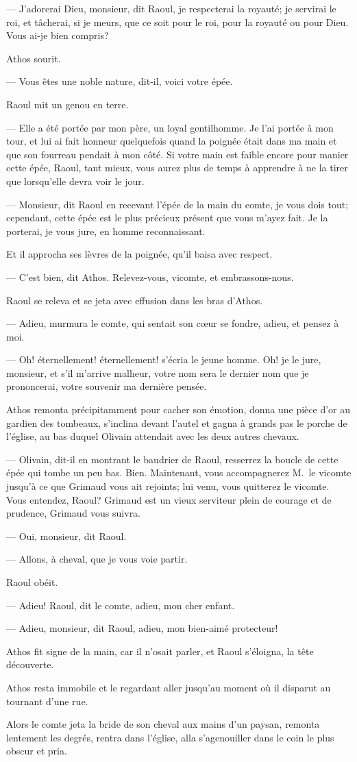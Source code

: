 — J'adorerai Dieu, monsieur, dit Raoul, je respecterai la royauté; je servirai le roi, et tâcherai, si je meurs, que ce soit pour le roi, pour la royauté ou pour Dieu. Vous ai-je bien compris?

Athos sourit.

— Vous êtes une noble nature, dit-il, voici votre épée.

Raoul mit un genou en terre.

— Elle a été portée par mon père, un loyal gentilhomme. Je l'ai portée à mon tour, et lui ai fait honneur quelquefois quand la poignée était dans ma main et que son fourreau pendait à mon côté. Si votre main est faible encore pour manier cette épée, Raoul, tant mieux, vous aurez plus de temps à apprendre à ne la tirer que lorsqu'elle devra voir le jour.

— Monsieur, dit Raoul en recevant l'épée de la main du comte, je vous dois tout; cependant, cette épée est le plus précieux présent que vous m'ayez fait. Je la porterai, je vous jure, en homme reconnaissant.

Et il approcha ses lèvres de la poignée, qu'il baisa avec respect.

— C'est bien, dit Athos. Relevez-vous, vicomte, et embrassons-nous.

Raoul se releva et se jeta avec effusion dans les bras d'Athos.

— Adieu, murmura le comte, qui sentait son cœur se fondre, adieu, et pensez à moi.

— Oh! éternellement! éternellement! s'écria le jeune homme. Oh! je le jure, monsieur, et s'il m'arrive malheur, votre nom sera le dernier nom que je prononcerai, votre souvenir ma dernière pensée.

Athos remonta précipitamment pour cacher son émotion, donna une pièce d'or au gardien des tombeaux, s'inclina devant l'autel et gagna à grands pas le porche de l'église, au bas duquel Olivain attendait avec les deux autres chevaux.

— Olivain, dit-il en montrant le baudrier de Raoul, resserrez la boucle de cette épée qui tombe un peu bas. Bien. Maintenant, vous accompagnerez M.~le vicomte jusqu'à ce que Grimaud vous ait rejoints; lui venu, vous quitterez le vicomte. Vous entendez, Raoul? Grimaud est un vieux serviteur plein de courage et de prudence, Grimaud vous suivra.

— Oui, monsieur, dit Raoul.

— Allons, à cheval, que je vous voie partir.

Raoul obéit.

— Adieu! Raoul, dit le comte, adieu, mon cher enfant.

— Adieu, monsieur, dit Raoul, adieu, mon bien-aimé protecteur!

Athos fit signe de la main, car il n'osait parler, et Raoul s'éloigna, la tête découverte.

Athos resta immobile et le regardant aller jusqu'au moment où il disparut au tournant d'une rue.

Alors le comte jeta la bride de son cheval aux mains d'un paysan, remonta lentement les degrés, rentra dans l'église, alla s'agenouiller dans le coin le plus obscur et pria.